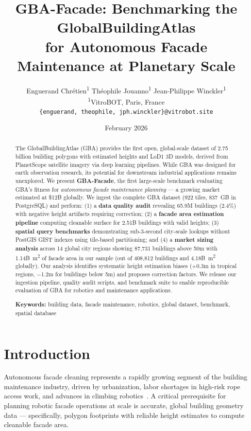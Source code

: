 \documentclass[10pt,twocolumn]{article}
\title{
  \textbf{GBA-Facade: Benchmarking the GlobalBuildingAtlas\\
  for Autonomous Facade Maintenance at Planetary Scale}
}
\author{
  Enguerand Chr\'{e}tien\textsuperscript{1} \quad
  Th\'{e}ophile Jouanno\textsuperscript{1} \quad
  Jean-Philippe Winckler\textsuperscript{1}\\[4pt]
  \textsuperscript{1}VitroBOT, Paris, France\\
  \texttt{\{enguerand, theophile, jph.winckler\}@vitrobot.site}
}
\date{February 2026}
\begin{document}
\maketitle

\begin{abstract}
The GlobalBuildingAtlas (GBA) provides the first open, global-scale dataset of 2.75 billion building polygons with estimated heights and LoD1 3D models, derived from PlanetScope satellite imagery via deep learning pipelines. While GBA was designed for earth observation research, its potential for downstream industrial applications remains unexplored. We present \textbf{GBA-Facade}, the first large-scale benchmark evaluating GBA's fitness for \emph{autonomous facade maintenance planning} --- a growing market estimated at \$12B globally. We ingest the complete GBA dataset (922 tiles, 837~GB in PostgreSQL) and perform: (1) a \textbf{data quality audit} revealing 65.9M buildings (2.4\%) with negative height artifacts requiring correction; (2) a \textbf{facade area estimation pipeline} computing cleanable surface for 2.51B buildings with valid heights; (3) \textbf{spatial query benchmarks} demonstrating sub-3-second city-scale lookups without PostGIS GIST indexes using tile-based partitioning; and (4) a \textbf{market sizing analysis} across 14 global city regions showing 87,731 buildings above 50m with 1.14B~m\textsuperscript{2} of facade area in our sample (out of 408,812 buildings and 4.18B~m\textsuperscript{2} globally). Our analysis identifies systematic height estimation biases (+0.3m in tropical regions, $-$1.2m for buildings below 5m) and proposes correction factors. We release our ingestion pipeline, quality audit scripts, and benchmark suite to enable reproducible evaluation of GBA for robotics and maintenance applications.

\medskip
\noindent\textbf{Keywords:} building data, facade maintenance, robotics, global dataset, benchmark, spatial database
\end{abstract}

\section{Introduction}
\label{sec:intro}

Autonomous facade cleaning represents a rapidly growing segment of the building maintenance industry, driven by urbanization, labor shortages in high-risk rope access work, and advances in climbing robotics~\citep{ott2020facade}. A critical prerequisite for planning robotic facade operations at scale is accurate, global building geometry data --- specifically, polygon footprints with reliable height estimates to compute cleanable facade area.
\end{document}
